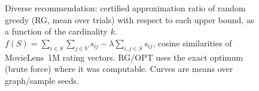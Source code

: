 \begin{figure}[t]
\centering
\setlength{\rgplotwidth}{0.49\columnwidth}
\\[1pt]
\hfill
\\
\hfill

\caption{Diverse recommendation: certified approximation ratio of random greedy (RG, mean over trials) with respect to each upper bound, as a function of the cardinality $k$. $f(S)=\sum_{i\in S}\sum_{j\in V}s_{ij}-\lambda\sum_{i,j\in S}s_{ij}$, cosine similarities of MovieLens~1M rating vectors. RG/OPT uses the exact optimum (brute force) where it was computable. Curves are means over graph/sample seeds.}
\label{fig:rg-diverse_rec}
\end{figure}
